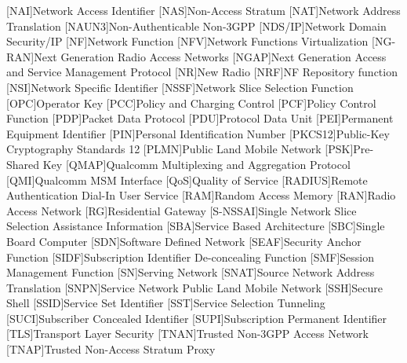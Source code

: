\begin{multicols}{2}
\begin{acronym}[WPA]
        [NAI]{Network Access Identifier}
        [NAS]{Non-Access Stratum}
        [NAT]{Network Address Translation}
        [NAUN3]{Non-Authenticable Non-3GPP}
        [NDS/IP]{Network Domain Security/IP}
        [NF]{Network Function}
        [NFV]{Network Functions Virtualization}
        [NG-RAN]{Next Generation Radio Access Networks}
        [NGAP]{Next Generation Access and Service Management Protocol}
        [NR]{New Radio}
        [NRF]{NF Repository function}
        [NSI]{Network Specific Identifier}
        [NSSF]{Network Slice Selection Function}
        [OPC]{Operator Key}
        [PCC]{Policy and Charging Control}
        [PCF]{Policy Control Function}
        [PDP]{Packet Data Protocol}
        [PDU]{Protocol Data Unit}
        [PEI]{Permanent Equipment Identifier}
        [PIN]{Personal Identification Number}
        [PKCS12]{Public-Key Cryptography Standards 12}
        [PLMN]{Public Land Mobile Network}
        [PSK]{Pre-Shared Key}
        [QMAP]{Qualcomm Multiplexing and Aggregation Protocol}
        [QMI]{Qualcomm MSM Interface}
        [QoS]{Quality of Service}
        [RADIUS]{Remote Authentication Dial-In User Service}
        [RAM]{Random Access Memory}
        [RAN]{Radio Access Network}
        [RG]{Residential Gateway}
        [S-NSSAI]{Single Network Slice Selection Assistance Information}
        [SBA]{Service Based Architecture}
        [SBC]{Single Board Computer}
        [SDN]{Software Defined Network}
        [SEAF]{Security Anchor Function}
        [SIDF]{Subscription Identifier De-concealing Function}
        [SMF]{Session Management Function}
        [SN]{Serving Network}
        [SNAT]{Source Network Address Translation}
        [SNPN]{Service Network Public Land Mobile Network}
        [SSH]{Secure Shell}
        [SSID]{Service Set Identifier}
        [SST]{Service Selection Tunneling}
        [SUCI]{Subscriber Concealed Identifier}
        [SUPI]{Subscription Permanent Identifier}
        [TLS]{Transport Layer Security}
        [TNAN]{Trusted Non-3GPP Access Network}
        [TNAP]{Trusted Non-Access Stratum Proxy}

\end{acronym}
\end{multicols}
